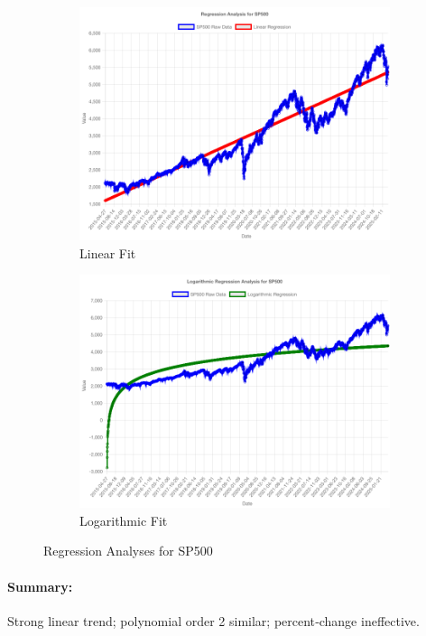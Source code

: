\documentclass[11pt,a4paper]{article}
\begin{document}
\begin{figure}[htbp]
  \centering
  \begin{subfigure}[b]{0.48\textwidth}
    \includegraphics[width=\textwidth]{backend/analyses/SP500_analysis.png}
    \caption{Linear Fit}
  \end{subfigure}
  \hfill
  \begin{subfigure}[b]{0.48\textwidth}
    \includegraphics[width=\textwidth]{backend/analyses/SP500_log_analysis.png}
    \caption{Logarithmic Fit}
  \end{subfigure}
  \caption{Regression Analyses for SP500}
\end{figure}

\paragraph{Summary:}
Strong linear trend; polynomial order 2 similar; percent‐change ineffective.
\end{document}
